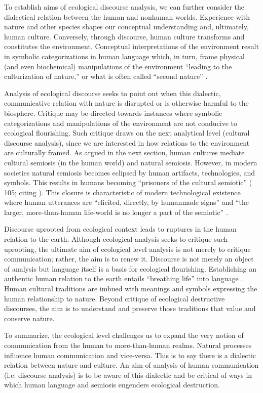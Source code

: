 To establish aims of ecological discourse analysis, we can further consider the dialectical relation between the human and nonhuman worlds. Experience with nature and other species shapes our conceptual understanding and, ultimately, human culture. Conversely, through discourse, human culture transforms and constitutes the environment. Conceptual interpretations of the environment result in symbolic categorizations in human language which, in turn, frame physical (and even biochemical) manipulations of the environment ``leading to the culturization of nature,'' or what is often called ``second nature'' \citep[45]{Maran2014a}. 

Analysis of ecological discourse seeks to point out when this dialectic, communicative relation with nature is disrupted or is otherwise harmful to the biosphere. Critique may be directed towards instances where symbolic categorizations and manipulations of the environment are not conducive to ecological flourishing. Such critique draws on the next analytical level (cultural discourse analysis), since we are interested in how relations to the environment are culturally framed. As argued in the next section, human cultures mediate cultural semiosis (in the human world) and natural semiosis. However, in modern societies natural semiosis becomes eclipsed by human artifacts, technologies, and symbols. This results in humans becoming ``prisoners of the cultural semiotic'' (\citealt{Stibbe2014b} 105; citing \citealt{Halliday1978a}). This closure is characteristic of modern technological existence where human utterances are ``elicited, directly, by humanmade signs'' and ``the larger, more-than-human life-world is no longer a part of the semiotic'' \citep[101]{Abram1997a}. 

Discourse uprooted from ecological context leads to ruptures in the human relation to the earth. Although ecological analysis seeks to critique such uprooting, the ultimate aim of ecological level analysis is not merely to critique communication; rather, the aim is to renew it. Discourse is not merely an object of analysis but language itself is a basis for ecological flourishing. Establishing an authentic human relation to the earth entails ``breathing life'' into language \citep[10]{Clingerman2014a}. Human cultural traditions are imbued with meanings and symbols expressing the human relationship to nature. Beyond critique of ecological destructive discourses, the aim is to understand and preserve those traditions that value and conserve nature.

To summarize, the ecological level challenges us to expand the very notion of communication from the human to more-than-human realms. Natural processes influence human communication and vice-versa. This is to say there is a dialectic relation between nature and culture. An aim of analysis of human communication (i.e. discourse analysis) is to be aware of this dialectic and be critical of ways in which human language and semiosis engenders ecological destruction. 

